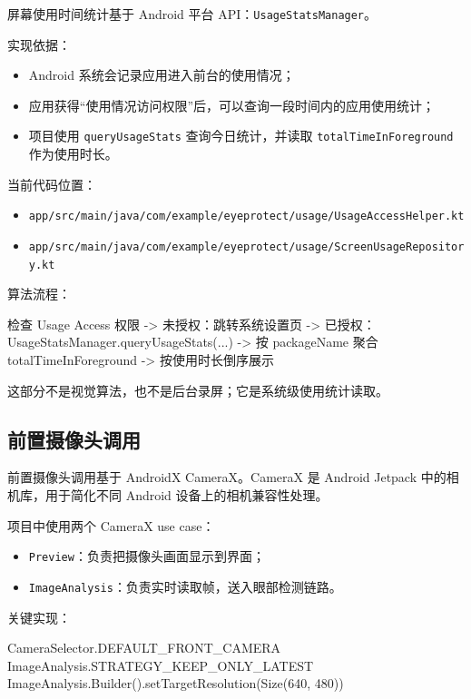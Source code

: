 \documentclass[UTF8,a4paper,11pt]{ctexart}
\begin{document}
屏幕使用时间统计基于 Android 平台 API：\texttt{UsageStatsManager}。

实现依据：

\begin{itemize}
  \item Android 系统会记录应用进入前台的使用情况；
  \item 应用获得“使用情况访问权限”后，可以查询一段时间内的应用使用统计；
  \item 项目使用 \texttt{queryUsageStats} 查询今日统计，并读取 \texttt{totalTimeInForeground} 作为使用时长。
\end{itemize}

当前代码位置：

\begin{itemize}
  \item \texttt{app/src/main/java/com/example/eyeprotect/usage/UsageAccessHelper.kt}
  \item \texttt{app/src/main/java/com/example/eyeprotect/usage/ScreenUsageRepository.kt}
\end{itemize}

算法流程：

\begin{code}
检查 Usage Access 权限
  -> 未授权：跳转系统设置页
  -> 已授权：UsageStatsManager.queryUsageStats(...)
  -> 按 packageName 聚合 totalTimeInForeground
  -> 按使用时长倒序展示
\end{code}

这部分不是视觉算法，也不是后台录屏；它是系统级使用统计读取。

\subsection{前置摄像头调用}

前置摄像头调用基于 AndroidX CameraX。CameraX 是 Android Jetpack 中的相机库，用于简化不同 Android 设备上的相机兼容性处理。

项目中使用两个 CameraX use case：

\begin{itemize}
  \item \texttt{Preview}：负责把摄像头画面显示到界面；
  \item \texttt{ImageAnalysis}：负责实时读取帧，送入眼部检测链路。
\end{itemize}

关键实现：

\begin{code}
CameraSelector.DEFAULT_FRONT_CAMERA
ImageAnalysis.STRATEGY_KEEP_ONLY_LATEST
ImageAnalysis.Builder().setTargetResolution(Size(640, 480))
\end{code}
\end{document}
